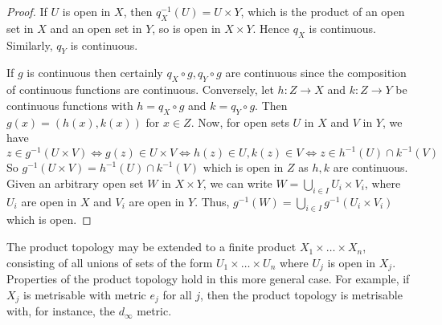 \begin{proof}
	If \( U \) is open in \( X \), then \( q_X^{-1}(U) = U \times Y \), which is the product of an open set in \( X \) and an open set in \( Y \), so is open in \( X \times Y \).
	Hence \( q_X \) is continuous.
	Similarly, \( q_Y \) is continuous.

	If \( g \) is continuous then certainly \( q_X \circ g, q_Y \circ g \) are continuous since the composition of continuous functions are continuous.
	Conversely, let \( h \colon Z \to X \) and \( k \colon Z \to Y \) be continuous functions with \( h = q_X \circ g \) and \( k = q_Y \circ g \).
	Then \( g(x) = (h(x), k(x)) \) for \( x \in Z \).
	Now, for open sets \( U \) in \( X \) and \( V \) in \( Y \), we have
	\[
		z \in g^{-1}(U \times V) \iff g(z) \in U \times V \iff h(z) \in U, k(z) \in V \iff z \in h^{-1}(U) \cap k^{-1}(V)
	\]
	So \( g^{-1}(U \times V) = h^{-1}(U) \cap k^{-1}(V) \) which is open in \( Z \) as \( h, k \) are continuous.
	Given an arbitrary open set \( W \) in \( X \times Y \), we can write \( W = \bigcup_{i\in I} U_i \times V_i \), where \( U_i \) are open in \( X \) and \( V_i \) are open in \( Y \).
	Thus, \( g^{-1}(W) = \bigcup_{i \in I} g^{-1}(U_i \times V_i) \) which is open.
\end{proof}
\begin{remark}
	The product topology may be extended to a finite product \( X_1 \times \dots \times X_n \), consisting of all unions of sets of the form \( U_1 \times \dots \times U_n \) where \( U_j \) is open in \( X_j \).
	Properties of the product topology hold in this more general case.
	For example, if \( X_j \) is metrisable with metric \( e_j \) for all \( j \), then the product topology is metrisable with, for instance, the \( d_\infty \) metric.
\end{remark}

